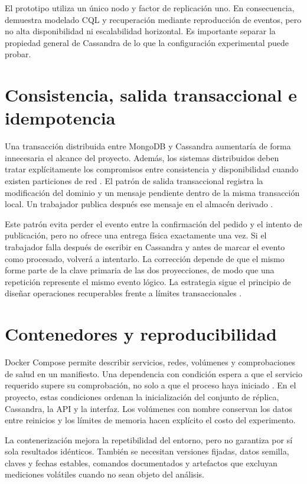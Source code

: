 El prototipo utiliza un único nodo y factor de replicación uno. En consecuencia, demuestra modelado CQL y recuperación mediante reproducción de eventos, pero no alta disponibilidad ni escalabilidad horizontal. Es importante separar la propiedad general de Cassandra de lo que la configuración experimental puede probar.

\section{Consistencia, salida transaccional e idempotencia}

Una transacción distribuida entre MongoDB y Cassandra aumentaría de forma innecesaria el alcance del proyecto. Además, los sistemas distribuidos deben tratar explícitamente los compromisos entre consistencia y disponibilidad cuando existen particiones de red \parencite{gilbert2002}. El patrón de salida transaccional registra la modificación del dominio y un mensaje pendiente dentro de la misma transacción local. Un trabajador publica después ese mensaje en el almacén derivado \parencite{richardson2018}.

Este patrón evita perder el evento entre la confirmación del pedido y el intento de publicación, pero no ofrece una entrega física exactamente una vez. Si el trabajador falla después de escribir en Cassandra y antes de marcar el evento como procesado, volverá a intentarlo. La corrección depende de que el mismo  forme parte de la clave primaria de las dos proyecciones, de modo que una repetición represente el mismo evento lógico. La estrategia sigue el principio de diseñar operaciones recuperables frente a límites transaccionales \parencite{helland2007,kleppmann2017}.

\section{Contenedores y reproducibilidad}

Docker Compose permite describir servicios, redes, volúmenes y comprobaciones de salud en un manifiesto. Una dependencia con condición  espera a que el servicio requerido supere su comprobación, no solo a que el proceso haya iniciado \parencite{dockerStartup}. En el proyecto, estas condiciones ordenan la inicialización del conjunto de réplica, Cassandra, la API y la interfaz. Los volúmenes con nombre conservan los datos entre reinicios y los límites de memoria hacen explícito el costo del experimento.

La contenerización mejora la repetibilidad del entorno, pero no garantiza por sí sola resultados idénticos. También se necesitan versiones fijadas, datos semilla, claves y fechas estables, comandos documentados y artefactos que excluyan mediciones volátiles cuando no sean objeto del análisis.
